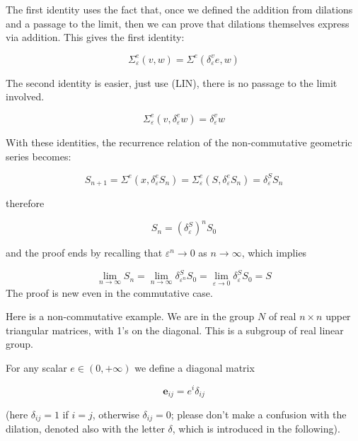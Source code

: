 \documentclass{article}
\begin{document}
The first identity uses the fact that, once we defined the addition from dilations and a passage to the limit, then we can prove that dilations themselves express via addition. This gives the first identity: 



$$ \Sigma^{e}_{\varepsilon}(v,w) = \Sigma^{e}(\delta^{v}_{\varepsilon} e, w)$$



The second identity is easier, just use (LIN), there is no passage to the limit involved.



$$ \Sigma^{e}_{\varepsilon}(v, \delta^{e}_{\varepsilon} w)  = \delta^{v}_{\varepsilon} w $$



With these identities, the recurrence relation of the non-commutative geometric series becomes: 



$$ S_{n+1} = \Sigma^{e}(x, \delta^{e}_{\varepsilon} S_{n}) = \Sigma^{e}_{\varepsilon}(S, \delta^{e}_{\varepsilon} S_{n}) = \delta^{S}_{\varepsilon} S_{n}$$



therefore 



$$ S_{n} = \left( \delta^{S}_{\varepsilon} \right)^{n} S_{0}$$



and the proof ends by recalling that $\varepsilon^{n} \rightarrow 0$ as $n \rightarrow \infty$, which implies 



$$ \lim_{n \rightarrow \infty} S_{n} = \lim_{n \rightarrow \infty} \delta^{S}_{\varepsilon^{n}} S_{0} = \lim_{\varepsilon \rightarrow 0} \delta^{S}_{\varepsilon} S_{0} = S$$
The proof is new even in the commutative case. 


Here is a non-commutative example. We are in the group $N$ of real $n \times n$ upper triangular matrices, with 1's on the diagonal. This is a subgroup of real linear group. 



For any scalar $e \in (0,+\infty)$ we define a diagonal matrix 



$$ \mathbf{e}_{ij} = e^{i} \delta_{ij}$$



(here $\delta_{ij} = 1$ if $i=j$, otherwise $\delta_{ij} = 0$; please don't make a confusion with the dilation, denoted also with the letter $\delta$, which is introduced in the following).
\end{document}

